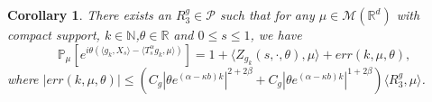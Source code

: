 \documentclass[12pt, a4paper]{amsart}
\newtheorem{cor}[thm]{Corollary}
\theoremstyle{definition}
\numberwithin{equation}{section}
\begin{document}
\begin{cor}
\label{cor: corollary1}
There exists an $R^g_3 \in \mathcal{P}$ such that for any $\mu\in \mathcal M(\mathbb R^d)$ with compact support, $k \in \mathbb{N}$,$\theta \in \mathbb{R}$ and $0\leq s\leq 1$, we have
\[
    \mathbb P_{\mu}[e^{i\theta(\langle g_k, X_s\rangle-\langle T_s^{\alpha}g_k,\mu \rangle)}]
    =1+\langle Z_{g_k}(s,\cdot,\theta),\mu\rangle+ err(k,\mu,\theta),
\]
    where $|err(k,\mu,\theta)| \leq (C_g|\theta e^{(\alpha-\kappa b)k}|^{2+2\beta} + C_g|\theta e^{(\alpha-\kappa b)k}|^{1+2\beta} )\langle R^g_3,\mu\rangle$.
\end{cor}
\end{document}
